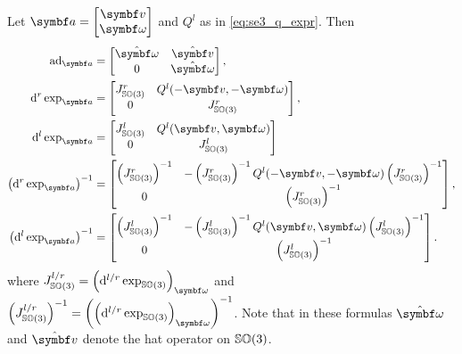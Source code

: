 \begin{properties}[title={Lowercase adjoint and exponential derivatives on $\SEthree$}]
  Let $\a = \begin{bmatrix} \bv \\ \bomega \end{bmatrix}$ and $Q^l$ as in \eqref{eq:se3_q_expr}. Then
  \begin{align}
    \ad_{\a}                                   & =  \begin{bmatrix}  \hat \bomega & \hat \bv \\ 0 & \hat \bomega \end{bmatrix},  \\
    \mathrm{d}^r \exp_{\a}                     & =   \begin{bmatrix} J^r_\SOthree & Q^l(-\bv, - \bomega) \\ 0 & J^r_\SOthree \end{bmatrix}, \\
    \mathrm{d}^l \exp_{\a}                     & = \begin{bmatrix} J^l_\SOthree & Q^l(\bv, \bomega) \\ 0 & J^l_\SOthree\end{bmatrix}    \\
    \left( \mathrm{d}^r \exp_{\a} \right)^{-1} & =  \begin{bmatrix} \left(J^r_\SOthree\right)^{-1}  &  -\left(J^r_\SOthree\right)^{-1} Q^l(-\bv, -\bomega)  \left(J^r_\SOthree\right)^{-1} \\ 0 &  \left(J^r_\SOthree\right)^{-1} \end{bmatrix},
    \\
    \left( \mathrm{d}^l \exp_{\a} \right)^{-1} & = \begin{bmatrix} \left(J^l_\SOthree\right)^{-1}  & -\left(J^l_\SOthree\right)^{-1} Q^l(\bv, \bomega)  \left(J^l_\SOthree\right)^{-1} \\ 0 &  \left(J^l_\SOthree\right)^{-1} \end{bmatrix} .
  \end{align}
  where $J^{l/r}_\SOthree = \left( \mathrm{d}^{l/r} \exp_{\SOthree} \right)_\bomega$ and $\left(J^{l/r}_\SOthree \right)^{-1} = \left( \left( \mathrm{d}^{l/r} \exp_{\SOthree} \right)_\bomega \right)^{-1}$. Note that in these formulas $\hat \bomega$ and $\hat \bv$ denote the hat operator on ${\mathbb{SO}(3)}$.
\end{properties}

